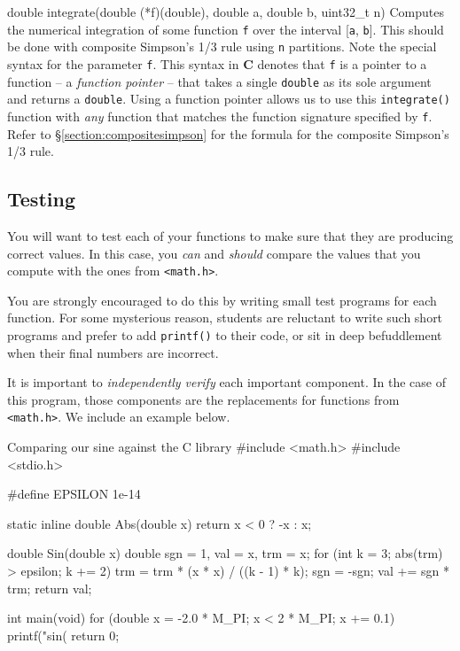 \begin{funcdoc}{double integrate(double (*f)(double), double a, double
  b, uint32\_t n)}
  Computes the numerical integration of some function \texttt{f} over the
  interval [\texttt{a}, \texttt{b}]. This should be done with composite
  Simpson's 1/3 rule using \texttt{n} partitions. Note the special syntax for
  the parameter \texttt{f}. This syntax in \textbf{C} denotes that \texttt{f} is
  a pointer to a function -- a \emph{function pointer} -- that takes a single
  \texttt{double} as its sole argument and returns a \texttt{double}. Using a
  function pointer allows us to use this \texttt{integrate()} function with
  \emph{any} function that matches the function signature specified by
  \texttt{f}. Refer to \S\ref{section:compositesimpson} for the formula for the
  composite Simpson's 1/3 rule.
\end{funcdoc}

\subsection{Testing}
You will want to test each of your functions to make sure that they
are producing correct values. In this case, you \emph{can} and
\emph{should} compare the values that you compute with the ones
from \texttt{<math.h>}.

You are strongly encouraged to do this by writing small test programs for each
function. For some mysterious reason, students are reluctant to write such short
programs and prefer to add \texttt{printf()} to their code, or sit in
deep befuddlement when their final numbers are incorrect.

It is important to \emph{independently verify} each important
component. In the case of this program, those components are the
replacements for functions from \texttt{<math.h>}.
We include an example below.

\begin{clisting}{Comparing our sine against the C library}
#include <math.h>
#include <stdio.h>

#define EPSILON 1e-14

static inline double Abs(double x) { return x < 0 ? -x : x; }

double Sin(double x) {
    double sgn = 1, val = x, trm = x;
    for (int k = 3; abs(trm) > epsilon; k += 2) {
        trm = trm * (x * x) / ((k - 1) * k);
        sgn = -sgn;
        val += sgn * trm;
    }
    return val;
}

int main(void) {
    for (double x = -2.0 * M_PI; x < 2 * M_PI; x += 0.1) {
        printf("sin(%
    }
    return 0;
}
\end{clisting}
